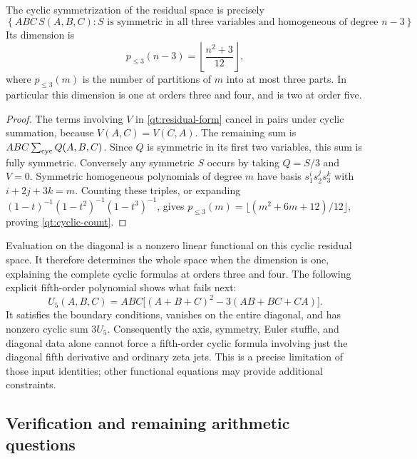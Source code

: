 \begin{corollary}\label{qt:cyclic-dimension}
The cyclic symmetrization of the residual space is precisely
\[
 \left\{ABC\,S(A,B,C): S\text{ is symmetric in all three variables
 and homogeneous of degree }n-3\right\}.
\]
Its dimension is
\begin{equation}\label{qt:cyclic-count}
 p_{\le3}(n-3)=\left\lfloor\frac{n^2+3}{12}\right\rfloor,
\end{equation}
where $p_{\le3}(m)$ is the number of partitions of $m$ into at most
three parts. In particular this dimension is one at orders three and
four, and is two at order five.
\end{corollary}
\begin{proof}
The terms involving $V$ in \eqref{qt:residual-form} cancel in pairs
under cyclic summation, because $V(A,C)=V(C,A)$. The remaining sum is
$ABC\sum_{\rm cyc}Q(A,B,C)$. Since $Q$ is symmetric in its first
two variables, this sum is fully symmetric. Conversely any symmetric
$S$ occurs by taking $Q=S/3$ and $V=0$. Symmetric homogeneous
polynomials of degree $m$ have basis $s_1^i s_2^j s_3^k$ with
$i+2j+3k=m$. Counting these triples, or expanding
$(1-t)^{-1}(1-t^2)^{-1}(1-t^3)^{-1}$, gives
$p_{\le3}(m)=\lfloor(m^2+6m+12)/12\rfloor$, proving
\eqref{qt:cyclic-count}.
\end{proof}

Evaluation on the diagonal is a nonzero linear functional on this
cyclic residual space. It therefore determines the whole space when
the dimension is one, explaining the complete cyclic formulas at
orders three and four. The following explicit fifth-order polynomial
shows what fails next:
\begin{equation}\label{qt:fifth-obstruction}
 U_5(A,B,C)=ABC\bigl[(A+B+C)^2-3(AB+BC+CA)\bigr].
\end{equation}
It satisfies the boundary conditions, vanishes on the entire diagonal,
and has nonzero cyclic sum $3U_5$. Consequently the axis, symmetry,
Euler stuffle, and diagonal data alone cannot force a fifth-order
cyclic formula involving just the diagonal fifth derivative and
ordinary zeta jets. This is a precise limitation of those input
identities; other functional equations may provide additional
constraints.

\subsection{Verification and remaining arithmetic questions}

